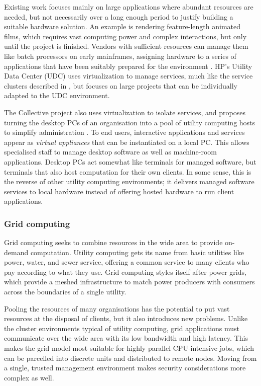 Existing work focuses mainly on large applications where abundant resources are needed, but not necessarily over a long enough period to justify building a suitable hardware solution. An example is rendering feature-length animated films, which requires vast computing power and complex interactions, but only until the project is finished. Vendors with sufficient resources can manage them like batch processors on early mainframes, assigning hardware to a series of applications that have been suitably prepared for the environment \cite{wilkes04}. HP's Utility Data Center (UDC) \cite{kallahalla} uses virtualization to manage services, much like the service clusters described in , but focuses on large projects that can be individually adapted to the UDC environment.

The Collective project also uses virtualization to isolate services, and proposes turning the desktop PCs of an organisation into a pool of utility computing hosts to simplify administration \cite{sapuntzakis03}. To end users, interactive applications and services appear as \emph{virtual appliances} that can be instantiated on a local PC. This allows specialised staff to manage desktop software as well as machine-room applications. Desktop PCs act somewhat like terminals for managed software, but terminals that also host computation for their own clients. In some sense, this is the reverse of other utility computing environments; it delivers managed software services to local hardware instead of offering hosted hardware to run client applications.

\subsubsection{Grid computing}

Grid computing \cite{foster,sungrid} seeks to combine resources in the wide area to provide on-demand computation. Utility computing gets its name from basic utilities like power, water, and sewer service, offering a common service to many clients who pay according to what they use. Grid computing styles itself after power grids, which provide a meshed infrastructure to match power producers with consumers across the boundaries of a single utility.

Pooling the resources of many organisations has the potential to put vast resources at the disposal of clients, but it also introduces new problems. Unlike the cluster environments typical of utility computing, grid applications must communicate over the wide area with its low bandwidth and high latency. This makes the grid model most suitable for highly parallel CPU-intensive jobs, which can be parcelled into discrete units and distributed to remote nodes. Moving from a single, trusted management environment makes security considerations more complex as well.

